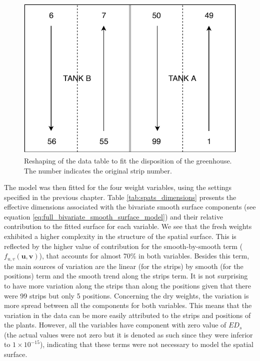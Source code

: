 \begin{figure}[hbtp]
	\centering
	\includegraphics[scale = 0.7]{figures/TANK_repartition.pdf}
	\caption[Reshaping of the data table to fit the disposition of the greenhouse]{Reshaping of the data table to fit the 
	disposition of the greenhouse. The number indicates the original strip number.}
	\label{fig:tank_disposition}	
\end{figure}

The model was then fitted for the four weight variables, using the settings specified in the previous chapter. Table \ref{tab:spats_dimensions} presents the effective dimensions associated with the bivariate smooth surface components (see equation \ref{eq:full_bivariate_smooth_surface_model}) 
and their relative contribution to the fitted surface for each variable.
We see that the fresh weights exhibited a higher complexity in the structure of the spatial surface. This is reflected by the higher value of contribution for the smooth-by-smooth term ($f_{u, v}(\boldsymbol{u}, \boldsymbol{v})$), that accounts for almost 70\% in both variables. Besides this term, the main sources of variation are the linear (for the strips) by smooth (for the positions) term and the smooth trend along the strips term. It is not surprising to have more variation along the strips than along the positions given that there were 99 strips but only 5 positions.
Concerning the dry weights, the variation is more spread between all the components for both variables. This means that the variation in the data can be more easily attributed to the strips and positions of the plants. However, all the variables have component with zero value of $ED_{s}$ (the actual values were not zero but it is denoted as such since they were inferior to $1 \times 10^{-15}$), indicating that these terms were not necessary to model the spatial surface.\\



